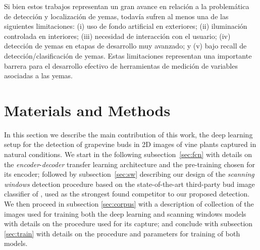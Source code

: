\documentclass[a4paper,authoryear,review]{elsarticle}
\begin{document}
Si bien estos trabajos representan un gran avance en relación a la problemática de detección y localización de yemas, todavía sufren al menos una de las siguientes limitaciones: (i) uso de fondo artificial en exteriores; (ii) iluminación controlada en interiores; (iii) necesidad de interacción con el usuario; (iv) detección de yemas en etapas de desarrollo muy avanzado; y (v) bajo recall de detección/clasificación de yemas. Estas limitaciones representan una importante barrera para el desarrollo efectivo de herramientas de medición de variables asociadas a las yemas. 

\section{Materials and Methods}
\label{sec:matmet}

In this section we describe the main contribution of this work, the  deep learning setup for the detection of grapevine buds in 2D images of vine plants captured in natural conditions. We start in the following subsection~\ref{sec:fcn} with details on the \emph{encoder}-\emph{decoder} transfer learning architecture and the pre-training chosen for its encoder; followed by subsection~\ref{sec:sw} describing our design of the \emph{scanning windows} detection procedure based on the state-of-the-art third-party bud image classifier of \cite{perez2017image}, used as the strongest found competitor to our proposed detection. 
%
We then proceed in subsection \ref{sec:corpus} with a description of collection of the images used for training both the deep learning and scanning windows models with details on the procedure used for its capture; and conclude with subsection \ref{sec:train} with details on the procedure and parameters for training of both models.
\end{document}
